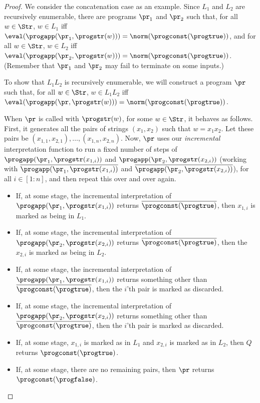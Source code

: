 \begin{proof}
We consider the concatenation case as an example.  Since $L_1$ and
$L_2$ are recursively enumerable, there are programs $\pr_1$ and
$\pr_2$ such that, for all $w\in\Str$, $w\in L_1$ iff
$\eval(\progapp(\pr_1,\progstr(w)))=\norm(\progconst(\progtrue))$, and
for all $w\in\Str$, $w\in L_2$ iff
$\eval(\progapp(\pr_2,\progstr(w)))=\norm(\progconst(\progtrue))$.
(Remember that $\pr_1$ and $\pr_2$ may fail to terminate on some
inputs.)

To show that $L_1L_2$ is recursively enumerable, we will construct a
program $\pr$ such that, for all $w\in\Str$, $w\in L_1L_2$ iff
$\eval(\progapp(\pr,\progstr(w)))=\norm(\progconst(\progtrue))$.

When $\pr$ is called with $\progstr(w)$, for some $w\in\Str$, it
behaves as follows.  First, it generates all the pairs of strings
$(x_1,x_2)$ such that $w=x_1x_2$.  Let these pairs be
$(x_{1,1},x_{2,1}),\ldots,(x_{1,n},x_{2,n})$.  Now, $\pr$ uses our
\emph{incremental} interpretation function to run a fixed number of
steps of $\progapp(\pr_1,\progstr(x_{1,i}))$ and
$\progapp(\pr_2,\progstr(x_{2,i}))$ (working with
$\overline{\progapp(\pr_1,\progstr(x_{1,i}))}$ and
$\overline{\progapp(\pr_2,\progstr(x_{2,i}))}$), for all $i\in[1:n]$,
and then repeat this over and over again.

\begin{itemize}
\item If, at some stage, the incremental interpretation of
  $\progapp(\pr_1,\progstr(x_{1,i}))$ returns
  $\overline{\progconst(\progtrue)}$, then $x_{1,i}$ is marked as being in
  $L_1$.

\item If, at some stage, the incremental interpretation of
  $\progapp(\pr_2,\progstr(x_{2,i}))$ returns
  $\overline{\progconst(\progtrue)}$, then the $x_{2,i}$ is marked as
  being in $L_2$.

\item If, at some stage, the incremental interpretation of
  $\progapp(\pr_1,\progstr(x_{1,i}))$ returns something other than
  $\overline{\progconst(\progtrue)}$, then the $i$'th pair is marked as
  discarded.

\item If, at some stage, the incremental interpretation of
  $\progapp(\pr_2,\progstr(x_{2,i}))$ returns something other than
  $\overline{\progconst(\progtrue)}$, then the $i$'th pair is marked as
  discarded.

\item If, at some stage, $x_{1,i}$ is marked as in $L_1$ and $x_{2,i}$
  is marked as in $L_2$, then $Q$ returns $\progconst(\progtrue)$.

\item If, at some stage, there are no remaining pairs, then $\pr$
  returns $\progconst(\progfalse)$.
\end{itemize}
\end{proof}

